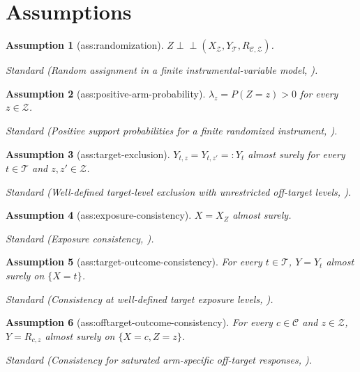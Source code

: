 \documentclass{article}
\newtheorem{assumption}{Assumption}
\begin{document}
\section{Assumptions}

\begin{assumption}[ass:randomization]\label{ass:randomization}
\(Z\perp\!\!\!\perp (X_{\mathcal Z},Y_{\mathcal T},R_{\mathcal C,\mathcal Z})\).
\par\smallskip\noindent\emph{Standard} (Random assignment in a finite instrumental-variable model, \cite{SongGuoChanRichardson2024}).
\end{assumption}

\begin{assumption}[ass:positive-arm-probability]\label{ass:positive-arm-probability}
\(\lambda_z=P(Z=z)>0\) for every \(z\in\mathcal Z\).
\par\smallskip\noindent\emph{Standard} (Positive support probabilities for a finite randomized instrument, \cite{SongGuoChanRichardson2024}).
\end{assumption}

\begin{assumption}[ass:target-exclusion]\label{ass:target-exclusion}
\(Y_{t,z}=Y_{t,z'}=:Y_t\) almost surely for every \(t\in\mathcal T\) and \(z,z'\in\mathcal Z\).
\par\smallskip\noindent\emph{Standard} (Well-defined target-level exclusion with unrestricted off-target levels, \cite{GabrielSachsSjolander2025}).
\end{assumption}

\begin{assumption}[ass:exposure-consistency]\label{ass:exposure-consistency}
\(X=X_Z\) almost surely.
\par\smallskip\noindent\emph{Standard} (Exposure consistency, \cite{SongGuoChanRichardson2024}).
\end{assumption}

\begin{assumption}[ass:target-outcome-consistency]\label{ass:target-outcome-consistency}
For every \(t\in\mathcal T\), \(Y=Y_t\) almost surely on \(\{X=t\}\).
\par\smallskip\noindent\emph{Standard} (Consistency at well-defined target exposure levels, \cite{GabrielSachsSjolander2025}).
\end{assumption}

\begin{assumption}[ass:offtarget-outcome-consistency]\label{ass:offtarget-outcome-consistency}
For every \(c\in\mathcal C\) and \(z\in\mathcal Z\), \(Y=R_{c,z}\) almost surely on \(\{X=c,Z=z\}\).
\par\smallskip\noindent\emph{Standard} (Consistency for saturated arm-specific off-target responses, \cite{GabrielSachsSjolander2025}).
\end{assumption}
\end{document}
